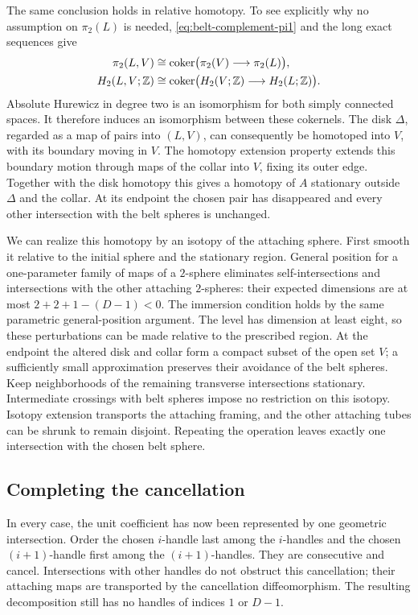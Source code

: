 The same conclusion holds in relative homotopy.  To see explicitly why
no assumption on $\pi_2(L)$ is needed, \eqref{eq:belt-complement-pi1}
and the long exact sequences give
\begin{align*}
 \pi_2(L,V)&\cong
 \operatorname{coker}\bigl(\pi_2(V)\longrightarrow\pi_2(L)\bigr),\\
 H_2(L,V;\mathbb Z)&\cong
 \operatorname{coker}\bigl(H_2(V;\mathbb Z)\longrightarrow H_2(L;\mathbb Z)\bigr).
\end{align*}
Absolute Hurewicz in degree two is an isomorphism for both simply
connected spaces.  It therefore induces an isomorphism between these
cokernels.  The disk $\Delta$, regarded as a map of pairs into $(L,V)$,
can consequently be homotoped into $V$, with its boundary moving in
$V$.  The homotopy extension property extends this boundary motion
through maps of the collar into $V$, fixing its outer edge.  Together
with the disk homotopy this gives a homotopy of $A$ stationary outside
$\Delta$ and the collar.  At its endpoint the
chosen pair has disappeared and every other intersection with the belt
spheres is unchanged.

We can realize this homotopy by an isotopy of the attaching sphere.
First smooth it relative to the initial sphere and the stationary
region.  General position for a one-parameter family of maps of a
$2$-sphere eliminates self-intersections and intersections with the
other attaching $2$-spheres: their expected dimensions are at most
$2+2+1-(D-1)<0$.  The immersion condition holds by the same parametric
general-position argument.  The level has dimension at least eight, so
these perturbations can be made relative to the prescribed region.
At the endpoint the altered disk and collar form a compact subset of
the open set $V$; a sufficiently small approximation preserves their
avoidance of the belt spheres.  Keep neighborhoods of the remaining
transverse intersections stationary.  Intermediate crossings with belt
spheres impose no restriction on this isotopy.  Isotopy extension
transports the attaching framing, and the other attaching tubes can be
shrunk to remain disjoint.  Repeating the operation leaves exactly one
intersection with the chosen belt sphere.

\subsection{Completing the cancellation}

In every case, the unit coefficient has now been represented by one
geometric intersection.  Order the chosen $i$-handle last among the
$i$-handles and the chosen $(i+1)$-handle first among the
$(i+1)$-handles.  They are consecutive and cancel.  Intersections with
other handles do not obstruct this cancellation; their attaching maps
are transported by the cancellation diffeomorphism.  The resulting
decomposition still has no handles of indices $1$ or $D-1$.

